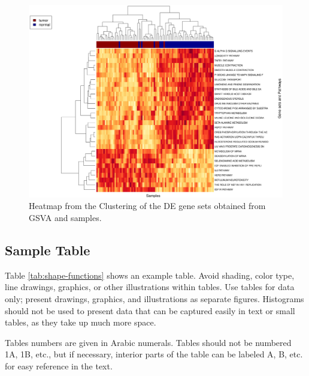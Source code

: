 \documentclass[9pt,twocolumn,twoside]{gsajnl}
\begin{document}
\begin{figure}[htbp]
\centering
\includegraphics[width=\linewidth]{ClusteringGSVA.eps}
\caption{Heatmap from the Clustering of the DE gene sets obtained from GSVA and samples.
}
\label{fig:ClusteringGSVA}
\end{figure}




\subsection*{Sample Table}

Table \ref{tab:shape-functions} shows an example table. Avoid shading, color type, line drawings, graphics, or other illustrations within tables. Use tables for data only; present drawings, graphics, and illustrations as separate figures. Histograms should not be used to present data that can be captured easily in text or small tables, as they take up much more space.

Tables numbers are given in Arabic numerals. Tables should not be numbered 1A, 1B, etc., but if necessary, interior parts of the table can be labeled A, B, etc. for easy reference in the text.
\end{document}
